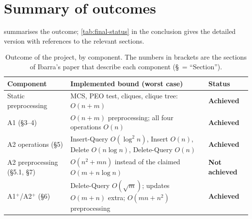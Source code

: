 \documentclass[11pt,a4paper,oneside]{report}
\theoremstyle{plain}
\theoremstyle{definition}
\theoremstyle{remark}
\newcommand{\op}[1]{\textsf{#1}}
\newcommand{\ok}{\textcolor{okgreen}{\textbf{Achieved}}}
\newcommand{\notok}{\textcolor{badred}{\textbf{Not achieved}}}
\begin{document}
\section{Summary of outcomes}
 summarises the outcome; \cref{tab:final-status} in the conclusion gives
the detailed version with references to the relevant sections.

\begin{table}[ht]
\centering
\caption[Outcome of the project, by component]{Outcome of the project, by component. The
numbers in brackets are the sections of Ibarra's paper that describe each component
(\S\ = ``Section'').}\label{tab:status-intro}
\begin{tabularx}{\textwidth}{@{}lXl@{}}
\toprule
\textbf{Component} & \textbf{Implemented bound (worst case)} & \textbf{Status}\\
\midrule
Static preprocessing & MCS, PEO test, cliques, clique tree: \(O(n+m)\) & \ok\\
A1 (\S3--4) & \(O(n+m)\) preprocessing; all four operations \(O(n)\) & \ok\\
A2 operations (\S5) & \op{Insert-Query} \(O(\log^2 n)\), \op{Insert} \(O(n)\), \op{Delete} \(O(n\log n)\), \op{Delete-Query} \(O(n)\) & \ok\\
A2 preprocessing (\S5.1, \S7) & \(O(n^2+mn)\) instead of the claimed \(O(m+n\log n)\) & \notok\\
A1\(^+\)/A2\(^+\) (\S6) & \op{Delete-Query} \(O(\sqrt m)\); updates \(O(m+n)\) extra; \(O(mn+n^2)\) preprocessing & \ok\\
\bottomrule
\end{tabularx}
\end{table}
\end{document}
